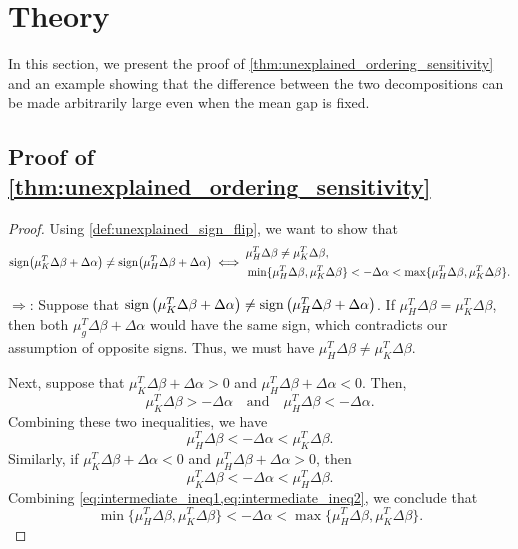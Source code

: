 \section{Theory}
\label{app:theory}

In this section, we present the proof of \cref{thm:unexplained_ordering_sensitivity} and an example showing that the difference between the two decompositions can be made arbitrarily large even when the mean gap is fixed.

\subsection{Proof of \cref{thm:unexplained_ordering_sensitivity}}
\label{sec:sign_flip_proof}
\begin{proof}
Using \cref{def:unexplained_sign_flip}, we want to show that 
\[
\operatorname{sign}\!\left( \mu_K^T \Delta\beta + \Delta\alpha \right)
\neq
\operatorname{sign}\!\left( \mu_H^T \Delta\beta + \Delta\alpha \right)
\iff
\begin{aligned}
&\mu_H^T \Delta\beta \neq \mu_K^T \Delta\beta, \\
&\min\{\mu_H^T \Delta\beta, \mu_K^T \Delta\beta\}
<
-\Delta\alpha
<
\max\{\mu_H^T \Delta\beta, \mu_K^T \Delta\beta\}.
\end{aligned}
\]


$\Rightarrow$: Suppose that $\operatorname{sign}\left( \mu_K^T \Delta\beta + \Delta\alpha \right) \neq \operatorname{sign}\left( \mu_H^T \Delta\beta + \Delta\alpha \right)$. If $\mu_H^T \Delta\beta = \mu_K^T \Delta\beta$, then both $\mu_g^T \Delta\beta + \Delta\alpha$ would have the same sign, which contradicts our assumption of opposite signs. Thus, we must have $\mu_H^T \Delta\beta \neq \mu_K^T \Delta\beta$.

Next, suppose that $\mu_K^T \Delta\beta + \Delta\alpha >0$ and $\mu_H^T \Delta\beta + \Delta\alpha <0$. Then, 
\[
\mu_K^T \Delta\beta > -\Delta\alpha \quad \text{and} \quad \mu_H^T \Delta\beta < -\Delta\alpha.
\]
Combining these two inequalities, we have 
\begin{equation}
  \label{eq:intermediate_ineq1}
  \mu_H^T \Delta\beta < -\Delta\alpha < \mu_K^T \Delta\beta.
\end{equation}
Similarly, if $\mu_K^T \Delta\beta + \Delta\alpha <0$ and $\mu_H^T \Delta\beta + \Delta\alpha >0$, then
\begin{equation}
  \label{eq:intermediate_ineq2}
  \mu_K^T \Delta\beta < -\Delta\alpha < \mu_H^T \Delta\beta.
\end{equation}
Combining \cref{eq:intermediate_ineq1,eq:intermediate_ineq2}, we conclude that
\[
  \min\{\mu_H^T \Delta\beta, \mu_K^T \Delta\beta\} < -\Delta\alpha < \max\{\mu_H^T \Delta\beta, \mu_K^T \Delta\beta\}.
\]


\end{proof}
